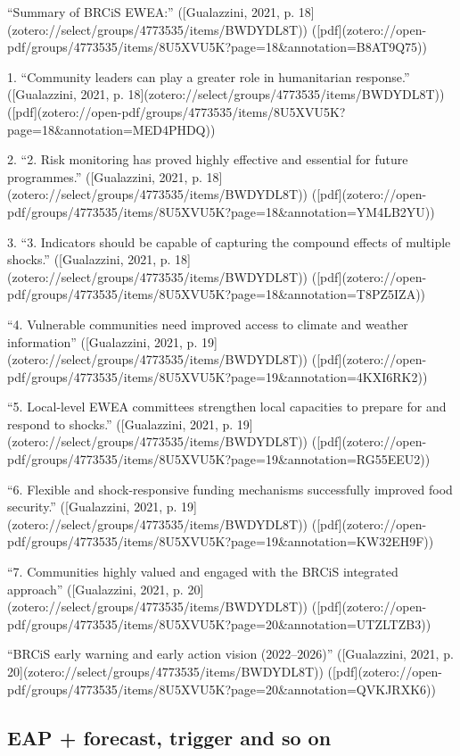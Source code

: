 {{%
“Summary of BRCiS EWEA:” ([Gualazzini, 2021, p. 18](zotero://select/groups/4773535/items/BWDYDL8T)) ([pdf](zotero://open-pdf/groups/4773535/items/8U5XVU5K?page=18&annotation=B8AT9Q75))

1. “Community leaders can play a greater role in humanitarian response.” ([Gualazzini, 2021, p. 18](zotero://select/groups/4773535/items/BWDYDL8T)) ([pdf](zotero://open-pdf/groups/4773535/items/8U5XVU5K?page=18&annotation=MED4PHDQ))

2. “2. Risk monitoring has proved highly effective and essential for future programmes.” ([Gualazzini, 2021, p. 18](zotero://select/groups/4773535/items/BWDYDL8T)) ([pdf](zotero://open-pdf/groups/4773535/items/8U5XVU5K?page=18&annotation=YM4LB2YU))


3. “3. Indicators should be capable of capturing the compound effects of multiple shocks.” ([Gualazzini, 2021, p. 18](zotero://select/groups/4773535/items/BWDYDL8T)) ([pdf](zotero://open-pdf/groups/4773535/items/8U5XVU5K?page=18&annotation=T8PZ5IZA))

“4. Vulnerable communities need improved access to climate and weather information” ([Gualazzini, 2021, p. 19](zotero://select/groups/4773535/items/BWDYDL8T)) ([pdf](zotero://open-pdf/groups/4773535/items/8U5XVU5K?page=19&annotation=4KXI6RK2))

“5. Local-level EWEA committees strengthen local capacities to prepare for and respond to shocks.” ([Gualazzini, 2021, p. 19](zotero://select/groups/4773535/items/BWDYDL8T)) ([pdf](zotero://open-pdf/groups/4773535/items/8U5XVU5K?page=19&annotation=RG55EEU2))

“6. Flexible and shock-responsive funding mechanisms successfully improved food security.” ([Gualazzini, 2021, p. 19](zotero://select/groups/4773535/items/BWDYDL8T)) ([pdf](zotero://open-pdf/groups/4773535/items/8U5XVU5K?page=19&annotation=KW32EH9F))

“7. Communities highly valued and engaged with the BRCiS integrated approach” ([Gualazzini, 2021, p. 20](zotero://select/groups/4773535/items/BWDYDL8T)) ([pdf](zotero://open-pdf/groups/4773535/items/8U5XVU5K?page=20&annotation=UTZLTZB3))

“BRCiS early warning and early action vision (2022–2026)” ([Gualazzini, 2021, p. 20](zotero://select/groups/4773535/items/BWDYDL8T)) ([pdf](zotero://open-pdf/groups/4773535/items/8U5XVU5K?page=20&annotation=QVKJRXK6))


\subsection{EAP + forecast, trigger and so on}

}}
